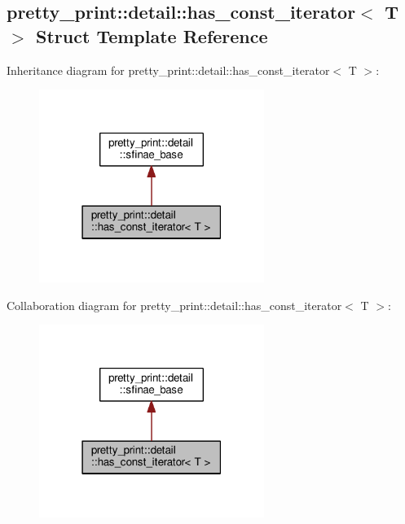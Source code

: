 \hypertarget{structpretty__print_1_1detail_1_1has__const__iterator}{}\subsection{pretty\+\_\+print\+:\+:detail\+:\+:has\+\_\+const\+\_\+iterator$<$ T $>$ Struct Template Reference}
\label{structpretty__print_1_1detail_1_1has__const__iterator}


Inheritance diagram for pretty\+\_\+print\+:\+:detail\+:\+:has\+\_\+const\+\_\+iterator$<$ T $>$\+:
\nopagebreak
\begin{figure}[H]
\begin{center}
\leavevmode
\includegraphics[width=207pt]{structpretty__print_1_1detail_1_1has__const__iterator__inherit__graph}
\end{center}
\end{figure}


Collaboration diagram for pretty\+\_\+print\+:\+:detail\+:\+:has\+\_\+const\+\_\+iterator$<$ T $>$\+:
\nopagebreak
\begin{figure}[H]
\begin{center}
\leavevmode
\includegraphics[width=207pt]{structpretty__print_1_1detail_1_1has__const__iterator__coll__graph}
\end{center}
\end{figure}
